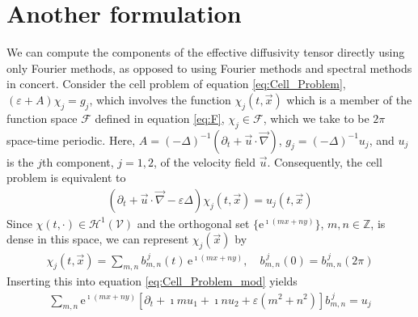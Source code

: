 \documentclass{article}
\newcommand{\e}{\mathrm{e}}
\newcommand{\Hc}{\mathcal{H}}
\newcommand{\Vc}{\mathcal{V}}
\newcommand{\Fc}{\mathcal{F}}
\newcommand{\0}{\mathbf{0}}
\newcommand{\1}{\mathbf{1}}
\newcommand{\2}{\mathbf{2}}
\newcommand{\3}{\mathbf{3}}
\newcommand{\4}{\mathbf{4}}
\newcommand{\5}{\mathbf{5}}
\newcommand{\6}{\mathbf{6}}
\newcommand{\7}{\mathbf{7}}
\newcommand{\8}{\mathbf{8}}
\begin{document}
\section{Another formulation}
%
We can compute the components of the effective diffusivity
tensor directly using only Fourier methods, as opposed to using Fourier
methods and spectral methods in concert. Consider the cell problem
of equation \eqref{eq:Cell_Problem}, $(\varepsilon+A)\chi_j=g_j$, which involves the
function $\chi_j(t,\vec{x})$ which is a member of the function space $\Fc$
defined in equation \eqref{eq:F}, $\chi_j\in\Fc$, which we take to be $2\pi$
space-time periodic. Here, $A=(-\Delta)^{-1}(\partial_t+\vec{u}\cdot\vec{\nabla})$,
$g_j=(-\Delta)^{-1}u_j$, and $u_j$ is the $j$th component, $j=1,2$, of
the velocity field $\vec{u}$. Consequently, the cell problem is
equivalent to 
%
\begin{align}\label{eq:Cell_Problem_mod}
  (\partial_t+\vec{u}\cdot\vec{\nabla}-\varepsilon\Delta)\chi_j(t,\vec{x})=u_j(t,\vec{x})
\end{align}
%
Since $\chi(t,\cdot)\in\Hc^1(\Vc)$ and the orthogonal set $\{\e^{\imath (mx+ny)}\}$, 
$m,n\in\mathbb{Z}$, is dense in this space, we can represent
$\chi_j(\vec{x})$ by  
%
\begin{align}\label{eq:x_Expansion}
  \chi_j(t,\vec{x})=\sum_{m,n}b^{\,j}_{m,n}(t)\,\e^{\imath (mx+ny)}, \quad
  b^{\,j}_{m,n}(0)=b^{\,j}_{m,n}(2\pi)
\end{align}
%  
Inserting this into equation \eqref{eq:Cell_Problem_mod} yields 
%
\begin{align}\label{eq:Cell_Problem_Fourier}
  \sum_{m,n}\e^{\imath (mx+ny)}[\partial_t+\imath mu_1+\imath nu_2+\varepsilon(m^2+n^2)]b^{\,j}_{m,n}=u_j
\end{align}
%
\end{document}
